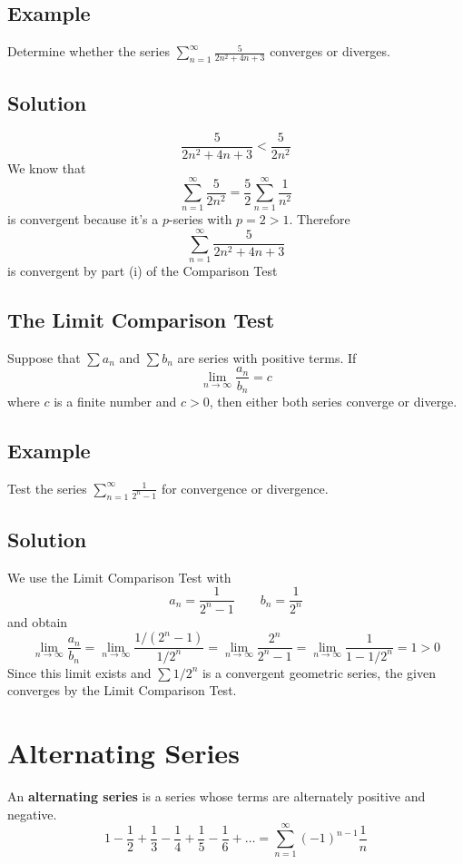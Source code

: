 \subsection*{Example}
Determine whether the series $\sum_{n=1}^\infty\frac{5}{2n^2+4n+3}$ converges or diverges.

\subsection*{Solution}
$$\frac{5}{2n^2+4n+3} < \frac{5}{2n^2}$$
We know that
$$\sum_{n=1}^\infty\frac{5}{2n^2}=\frac{5}{2}\sum_{n=1}^\infty\frac{1}{n^2}$$
is convergent because it's a $p$-series with $p=2>1$. Therefore
$$\sum_{n=1}^\infty\frac{5}{2n^2+4n+3}$$
is convergent by part (i) of the Comparison Test

\subsection*{The Limit Comparison Test}
Suppose that $\sum a_n$ and $\sum b_n$ are series with positive terms. If
$$ \lim_{n \to \infty} \frac{a_n}{b_n} = c $$
where $c$ is a finite number and $c>0$, then either both series converge or diverge.

\subsection*{Example}
Test the series $\sum_{n=1}^\infty\frac{1}{2^n-1}$ for convergence or divergence.

\subsection*{Solution}
We use the Limit Comparison Test with
$$a_n=\frac{1}{2^n-1} \qquad b_n=\frac{1}{2^n}$$
and obtain
$$\lim_{n\to\infty}\frac{a_n}{b_n}=\lim_{n\to\infty}\frac{1/(2^n-1)}{1/2^n}=
    \lim_{n\to\infty}\frac{2^n}{2^n-1}=\lim_{n\to\infty}\frac{1}{1-1/2^n}=1>0$$
Since this limit exists and $\sum 1/2^n$ is a convergent geometric series, the given
converges by the Limit Comparison Test.

\section{Alternating Series}
An \textbf{alternating series} is a series whose terms are alternately positive and negative.
$$ 1-\frac{1}{2}+\frac{1}{3}-\frac{1}{4}+\frac{1}{5}-\frac{1}{6}+\dots = \sum_{n=1}^\infty (-1)^{n-1} \frac{1}{n} $$


